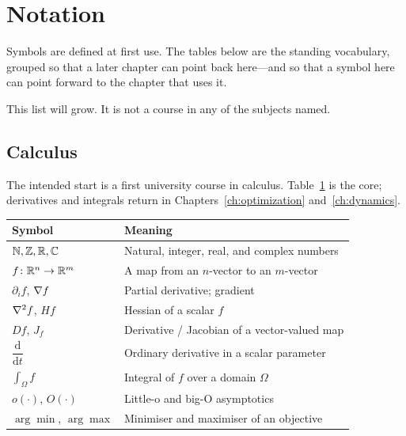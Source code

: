 \chapter*{Notation}
\label{front:notation}

Symbols are defined at first use. The tables below are the standing vocabulary, grouped so that a later chapter can point back here---and so that a symbol here can point forward to the chapter that uses it.

This list will grow. It is not a course in any of the subjects named.

\begingroup
\renewcommand{\thetable}{N.\arabic{table}}

\section*{Calculus}
\label{not:calculus}

The intended start is a first university course in calculus. Table~\ref{tab:notation-calculus} is the core; derivatives and integrals return in Chapters~\ref{ch:optimization} and~\ref{ch:dynamics}.

\begin{table}[htbp]
\centering
{}
\label{tab:notation-calculus}
\begin{tabular}{@{}ll@{}}
\toprule
Symbol & Meaning \\
\midrule
$\mathbb{N},\mathbb{Z},\mathbb{R},\mathbb{C}$ & Natural, integer, real, and complex numbers \\
$f\colon \mathbb{R}^n\to\mathbb{R}^m$ & A map from an $n$-vector to an $m$-vector \\
$\partial_i f$, $\nabla f$ & Partial derivative; gradient \\
$\nabla^2 f$, $Hf$ & Hessian of a scalar $f$ \\
$Df$, $J_f$ & Derivative / Jacobian of a vector-valued map \\
$\dfrac{\mathrm{d}}{\mathrm{d}t}$ & Ordinary derivative in a scalar parameter \\
$\int_{\Omega} f$ & Integral of $f$ over a domain $\Omega$ \\
$o(\cdot)$, $O(\cdot)$ & Little-o and big-O asymptotics \\
$\arg\min$, $\arg\max$ & Minimiser and maximiser of an objective \\
\bottomrule
\end{tabular}
\end{table}

